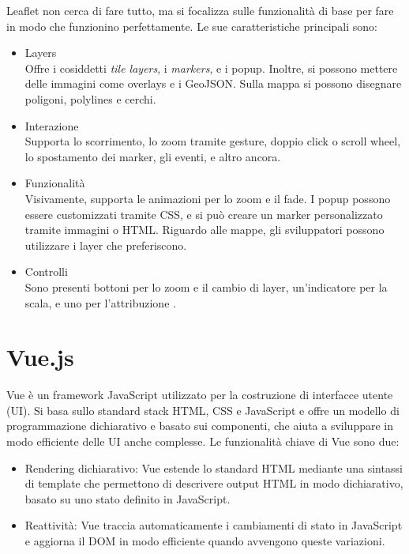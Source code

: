 Leaflet non cerca di fare tutto, ma si focalizza sulle funzionalità di base per fare in modo che funzionino perfettamente. Le sue caratteristiche principali sono:
\begin{itemize}
    \item Layers\\
    Offre i cosiddetti \textit{tile layers}, i \textit{markers}, e i popup. Inoltre, si possono mettere delle immagini come overlays e i GeoJSON. Sulla mappa si possono disegnare poligoni, polylines e cerchi.
    \item Interazione\\
    Supporta lo scorrimento, lo zoom tramite gesture, doppio click o scroll wheel, lo spostamento dei marker, gli eventi, e altro ancora.
    \item Funzionalità\\
    Visivamente, supporta le animazioni per lo zoom e il fade. I popup possono essere customizzati tramite CSS, e si può creare un marker personalizzato tramite immagini o HTML. Riguardo alle mappe, gli sviluppatori possono utilizzare i layer che preferiscono.
    \item Controlli\\
    Sono presenti bottoni per lo zoom e il cambio di layer, un'indicatore per la scala, e uno per l'attribuzione \cite{Leaflet_Overview}.
\end{itemize}

\section{Vue.js}
Vue è un framework JavaScript utilizzato per la costruzione di interfacce utente (UI). Si basa sullo standard stack HTML, CSS e JavaScript e offre un modello di programmazione dichiarativo e basato sui componenti, che aiuta a sviluppare in modo efficiente delle UI anche complesse. Le funzionalità chiave di Vue sono due:
\begin{itemize}
    \item Rendering dichiarativo: Vue estende lo standard HTML mediante una sintassi di template che permettono di descrivere output HTML in modo dichiarativo, basato su uno stato definito in JavaScript.
    \item Reattività: Vue traccia automaticamente i cambiamenti di stato in JavaScript e aggiorna il DOM in modo efficiente quando avvengono queste variazioni.
\end{itemize}

